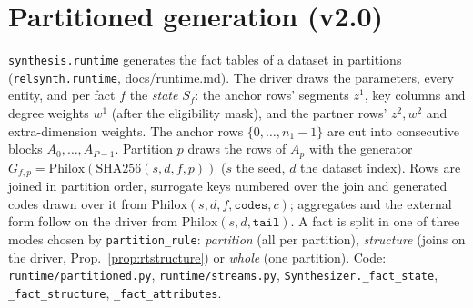 \section{Partitioned generation (v2.0)}\label{sec:runtime}
\setcounter{savedproprt}{\value{proposition}}
\texttt{synthesis.runtime} generates the fact tables of a dataset in partitions (\texttt{relsynth.runtime}, docs/runtime.md). The driver draws the parameters, every entity, and per fact $f$ the \emph{state} $S_f$: the anchor rows' segments $z^1$, key columns and degree weights $w^1$ (after the eligibility mask), and the partner rows' $z^2,w^2$ and extra-dimension weights. The anchor rows $\{0,\dots,n_1-1\}$ are cut into consecutive blocks $A_0,\dots,A_{P-1}$. Partition $p$ draws the rows of $A_p$ with the generator $G_{f,p}=\mathrm{Philox}(\mathrm{SHA256}(s,d,f,p))$ ($s$ the seed, $d$ the dataset index). Rows are joined in partition order, surrogate keys numbered over the join and generated codes drawn over it from $\mathrm{Philox}(s,d,f,\texttt{codes},c)$; aggregates and the external form follow on the driver from $\mathrm{Philox}(s,d,\texttt{tail})$. A fact is split in one of three modes chosen by \texttt{partition\_rule}: \emph{partition} (all per partition), \emph{structure} (joins on the driver, Prop.~\ref{prop:rtstructure}) or \emph{whole} (one partition). Code: \texttt{runtime/partitioned.py}, \texttt{runtime/streams.py}, \texttt{Synthesizer.\_fact\_state}, \texttt{\_fact\_structure}, \texttt{\_fact\_attributes}.

